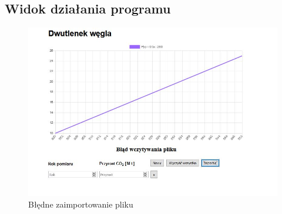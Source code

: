\documentclass[12pt]{article}
\begin{document}
\subsection{Widok działania programu}
\begin{figure}[h]
\centering
\includegraphics[scale=0.65]{errorPic.jpg}
\caption{Błędne zaimportowanie pliku}
\end{figure}
\end{document}
